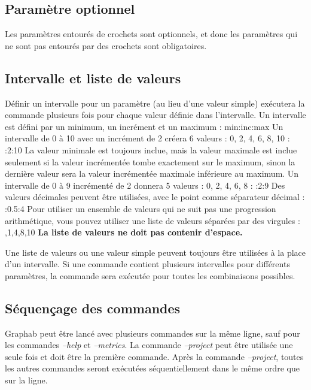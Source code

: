 \documentclass[a4paper,10pt]{report}
\newenvironment{cmd}
{\quote\Verbatim}
{\endVerbatim\endquote}
\begin{document}
\subsection{Paramètre optionnel}
Les paramètres entourés de crochets sont optionnels, et donc les paramètres qui ne sont pas entourés par des crochets sont obligatoires.
\subsection{Intervalle et liste de valeurs}
Définir un intervalle pour un paramètre (au lieu d'une valeur simple) exécutera la commande plusieurs fois pour chaque valeur définie dans l'intervalle.
Un intervalle est défini par un minimum, un incrément et un maximum :
\begin{cmd}
min:inc:max
\end{cmd}
Un intervalle de 0 à 10 avec un incrément de 2 créera 6 valeurs : 0, 2, 4, 6, 8, 10 :
\begin{cmd}
0:2:10
\end{cmd}
La valeur minimale est toujours inclue, mais la valeur maximale est inclue seulement si la valeur incrémentée tombe exactement sur le maximum, 
sinon la dernière valeur sera la valeur incrémentée maximale inférieure au maximum.
Un intervalle de 0 à 9 incrémenté de 2 donnera 5 valeurs : 0, 2, 4, 6, 8 :
\begin{cmd}
0:2:9
\end{cmd}
Des valeurs décimales peuvent être utilisées, avec le point comme séparateur décimal :
\begin{cmd}
1.5:0.5:4
\end{cmd}
Pour utiliser un ensemble de valeurs qui ne suit pas une progression arithmétique, vous pouvez utiliser une liste de valeurs séparées par des virgules :
\begin{cmd}
0,1,4,8,10
\end{cmd}
\textbf{La liste de valeurs ne doit pas contenir d'espace.}

Une liste de valeurs ou une valeur simple peuvent toujours être utilisées à la place d'un intervalle.
Si une commande contient plusieurs intervalles pour différents paramètres, la commande sera exécutée pour toutes les combinaisons possibles.

\subsection{Séquençage des commandes}
Graphab peut être lancé avec plusieurs commandes sur la même ligne, sauf pour les commandes \textit{--help} et \textit{--metrics}.
La commande \textit{--project} peut être utilisée une seule fois et doit être la première commande.
Après la commande \textit{--project}, toutes les autres commandes seront exécutées séquentiellement dans le même ordre que sur la ligne.
\end{document}
